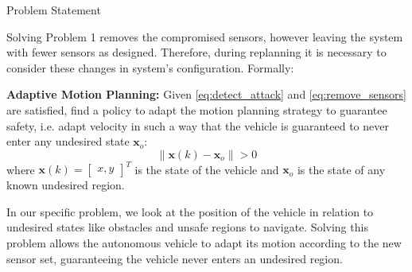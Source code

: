 \begin{section}{Problem Statement}
\begin{problem}
\end{problem}
Solving Problem 1 removes the compromised sensors, however leaving the system with fewer sensors as designed. Therefore, during replanning it is necessary to consider these changes in system's configuration. Formally:
	
\begin{problem} \label{problem2} {\textbf{Adaptive Motion Planning:}}
Given \eqref{eq:detect_attack} and \eqref{eq:remove_sensors} are satisfied, find a policy to adapt the motion planning strategy to guarantee safety, i.e. adapt velocity in such a way that the vehicle is guaranteed to never enter any undesired state $\bm{x}_o$:  
	\begin{equation}
		\lVert {\bm{x}(k)-\bm{x}_o} \rVert > 0
	\end{equation}
where $\bm{x}(k)={\begin{bmatrix} x,y \end{bmatrix}}^T$ is the state of the vehicle and $\bm{x}_o$ is the state of any known undesired region.
	\end{problem}

In our specific problem, we look at the position of the vehicle in relation to undesired states like obstacles and unsafe regions to navigate. Solving this problem allows the autonomous vehicle to adapt its motion according to the new sensor set, guaranteeing the vehicle never enters an undesired region.
\end{section}